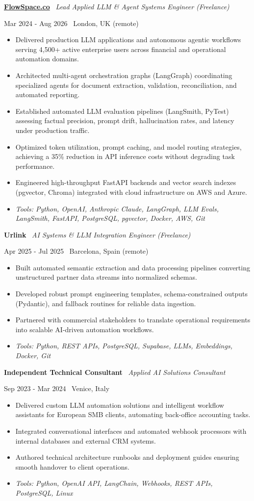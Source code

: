 \documentclass[a4paper,10pt]{article}
\newcommand{\role}[4]{%
  \vspace{2pt}\noindent
  \begin{minipage}[t]{0.70\textwidth}\raggedright\textbf{#1} \textbullet\ \textit{#3}\end{minipage}%
  \hfill
  \begin{minipage}[t]{0.28\textwidth}\raggedleft\footnotesize\color{gray}#2 \textbullet\ #4\end{minipage}%
  \vspace{1pt}%
}
\begin{document}
\role{\href{https://flowspace.co}{FlowSpace.co}}{Mar 2024 - Aug 2026}{Lead Applied LLM \& Agent Systems Engineer (Freelance)}{London, UK (remote)}
\begin{itemize}
  \item Delivered production LLM applications and autonomous agentic workflows serving 4,500+ active enterprise users across financial and operational automation domains.
  \item Architected multi-agent orchestration graphs (LangGraph) coordinating specialized agents for document extraction, validation, reconciliation, and automated reporting.
  \item Established automated LLM evaluation pipelines (LangSmith, PyTest) assessing factual precision, prompt drift, hallucination rates, and latency under production traffic.
  \item Optimized token utilization, prompt caching, and model routing strategies, achieving a 35\% reduction in API inference costs without degrading task performance.
  \item Engineered high-throughput FastAPI backends and vector search indexes (pgvector, Chroma) integrated with cloud infrastructure on AWS and Azure.
  \item \textit{Tools: Python, OpenAI, Anthropic Claude, LangGraph, LLM Evals, LangSmith, FastAPI, PostgreSQL, pgvector, Docker, AWS, Git}
\end{itemize}

\role{Urlink}{Apr 2025 - Jul 2025}{AI Systems \& LLM Integration Engineer (Freelance)}{Barcelona, Spain (remote)}
\begin{itemize}
  \item Built automated semantic extraction and data processing pipelines converting unstructured partner data streams into normalized schemas.
  \item Developed robust prompt engineering templates, schema-constrained outputs (Pydantic), and fallback routines for reliable data ingestion.
  \item Partnered with commercial stakeholders to translate operational requirements into scalable AI-driven automation workflows.
  \item \textit{Tools: Python, REST APIs, PostgreSQL, Supabase, LLMs, Embeddings, Docker, Git}
\end{itemize}

\role{Independent Technical Consultant}{Sep 2023 - Mar 2024}{Applied AI Solutions Consultant}{Venice, Italy}
\begin{itemize}
  \item Delivered custom LLM automation solutions and intelligent workflow assistants for European SMB clients, automating back-office accounting tasks.
  \item Integrated conversational interfaces and automated webhook processors with internal databases and external CRM systems.
  \item Authored technical architecture runbooks and deployment guides ensuring smooth handover to client operations.
  \item \textit{Tools: Python, OpenAI API, LangChain, Webhooks, REST APIs, PostgreSQL, Linux}
\end{itemize}
\end{document}
